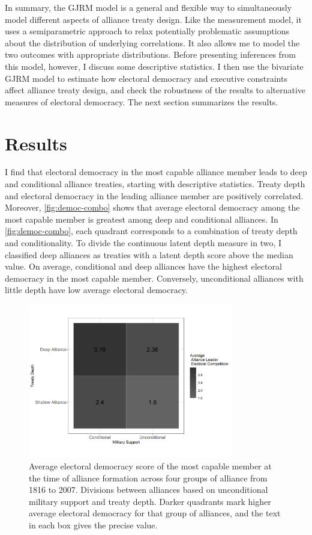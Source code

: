 \documentclass[12pt]{article}
\begin{document}
In summary, the GJRM model is a general and flexible way to simultaneously model different aspects of alliance treaty design.
Like the measurement model, it uses a semiparametric approach to relax potentially problematic assumptions about the distribution of underlying correlations. 
It also allows me to model the two outcomes with appropriate distributions. 
Before presenting inferences from this model, however, I discuss some descriptive statistics. 
I then use the bivariate GJRM model to estimate how electoral democracy and executive constraints affect alliance treaty design, and check the robustness of the results to alternative measures of electoral democracy. 
The next section summarizes the results. 


\section{Results}


I find that electoral democracy in the most capable alliance member leads to deep and conditional alliance treaties, starting with descriptive statistics. 
Treaty depth and electoral democracy in the leading alliance member are positively correlated. 
Moreover, \autoref{fig:democ-combo} shows that average electoral democracy among the most capable member is greatest among deep and conditional alliances. 	
In \autoref{fig:democ-combo}, each quadrant corresponds to a combination of treaty depth and conditionality. 
To divide the continuous latent depth measure in two, I classified deep alliances as treaties with a latent depth score above the median value. 
On average, conditional and deep alliances have the highest electoral democracy in the most capable member. 
Conversely, unconditional alliances with little depth have low average electoral democracy.


\begin{figure}[hbtp]
\centering
\includegraphics[width=0.8\textwidth]{../figures/democ-combo.png}
\caption{Average electoral democracy score of the most capable member at the time of alliance formation across four groups of alliance from 1816 to 2007. Divisions between alliances based on unconditional military support and treaty depth. Darker quadrants mark higher average electoral democracy for that group of alliances, and the text in each box gives the precise value.}
\label{fig:democ-combo}
\end{figure}
\end{document}
